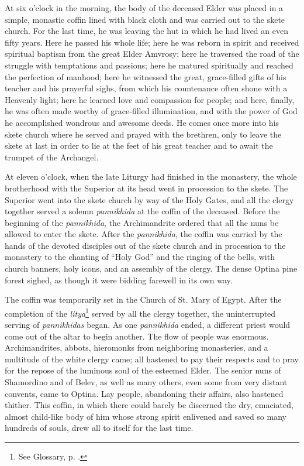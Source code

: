 At six o'clock in the morning, the body of the deceased Elder was placed in a simple, monastic coffin lined with black cloth and was carried out to the skete church. For the last time, he was leaving the hut in which he had lived an even fifty years. Here he passed his whole life; here he was reborn in spirit and received spiritual baptism from the great Elder Amvrosy; here he traversed the road of the struggle with temptations and passions; here he matured spiritually and reached the perfection of manhood; here he witnessed the great, grace-filled gifts of his teacher and his prayerful sighs, from which his countenance often shone with a Heavenly light; here he learned love and compassion for people; and here, finally, he was often made worthy of grace-filled illumination, and with the power of God he accomplished wondrous and awesome deeds. He comes once more into his skete church where he served and prayed with the brethren, only to leave the skete at last in order to lie at the feet of his great teacher and to await the trumpet of the Archangel.

At eleven o'clock, when the late Liturgy had finished in the monastery, the whole brotherhood with the Superior at its head went in procession to the skete. The Superior went into the skete church by way of the Holy Gates, and all the clergy together served a solemn \textit{pannikhida} at the coffin of the deceased. Before the beginning of the \textit{pannikhida}, the Archimandrite ordered that all the nuns be allowed to enter the skete. After the \textit{pannikhida}, the coffin was carried by the hands of the devoted disciples out of the skete church and in procession to the monastery to the chanting of ``Holy God'' and the ringing of the bells, with church banners, holy icons, and an assembly of the clergy. The dense Optina pine forest sighed, as though it were bidding farewell in its own way.

The coffin was temporarily set in the Church of St. Mary of Egypt. After the completion of the \textit{litya}\footnote{See Glossary, p. \pageref{litya}.} served by all the clergy together, the uninterrupted serving of \textit{pannikhidas} began. As one \textit{pannikhida} ended, a different priest would come out of the altar to begin another. The flow of people was enormous. Archimandrites, abbots, hieromonks from neighboring monasteries, and a multitude of the white clergy came; all hastened to pay their respects and to pray for the repose of the luminous soul of the esteemed Elder. The senior nuns of Shamordino and of Belev, as well as many others, even some from very distant convents, came to Optina. Lay people, abandoning their affairs, also hastened thither. This coffin, in which there could barely be discerned the dry, emaciated, almost child-like body of him whose strong spirit enlivened and saved so many hundreds of souls, drew all to itself for the last time.

